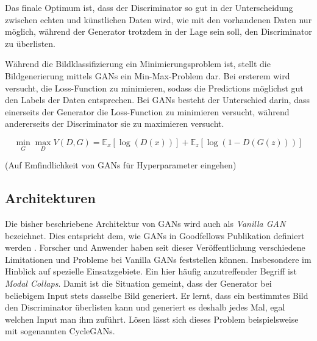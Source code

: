 Das finale Optimum ist, dass der Discriminator so gut in der Unterscheidung zwischen echten und künstlichen Daten wird, wie mit den vorhandenen Daten nur möglich, während der Generator trotzdem in der Lage sein soll, den Discriminator zu überlisten. \cite[S. 656]{visualApproach}

Während die Bildklassifizierung ein Minimierungsproblem ist, stellt die Bildgenerierung mittels \acp{GAN} ein Min-Max-Problem dar. Bei ersterem wird versucht, die Loss-Function zu minimieren, sodass die Predictions möglichst gut den Labels der Daten entsprechen. Bei \acp{GAN} besteht der Unterschied darin, dass einerseits der Generator die Loss-Function zu minimieren versucht, während andererseits der Discriminator sie zu maximieren versucht.

\begin{equation}
	\min_{G} \max_{D} V(D,G) = \mathbb{E}_{x}[\log(D(x))] + \mathbb{E}_{z}[\log(1-D(G(z)))]
\end{equation}

(Auf Emfindlichkeit von GANs für Hyperparameter eingehen)

\subsection{Architekturen}
Die bisher beschriebene Architektur von \acp{GAN} wird auch als \emph{Vanilla \ac{GAN}} bezeichnet. Dies entspricht dem, wie \acp{GAN} in Goodfellows Publikation definiert werden \cite{Goodfellow-GANs}. Forscher und Anwender haben seit dieser Veröffentlichung verschiedene Limitationen und Probleme bei Vanilla \acp{GAN} feststellen können. Insbesondere im Hinblick auf spezielle Einsatzgebiete. Ein hier häufig anzutreffender Begriff ist \emph{Modal Collaps}. Damit ist die Situation gemeint, dass der Generator bei beliebigem Input stets dasselbe Bild generiert. Er lernt, dass ein bestimmtes Bild den Discriminator überlisten kann und generiert es deshalb jedes Mal, egal welchen Input man ihm zuführt. Lösen lässt sich dieses Problem beispielsweise mit sogenannten \acp{CycleGAN}.

